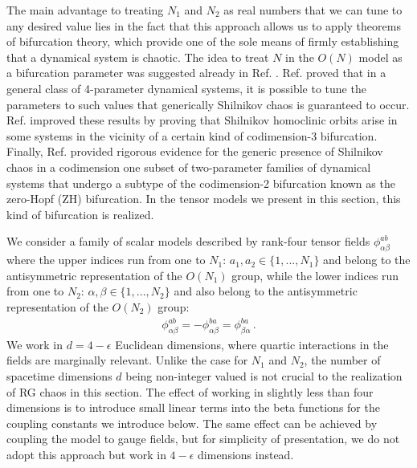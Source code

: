 The main advantage to treating $N_1$ and $N_2$ as real numbers that we can tune to any desired value lies in the fact that this approach allows us to apply theorems of bifurcation theory, which provide one of the sole means of firmly establishing that a dynamical system is chaotic. The idea to treat $N$ in the $O(N)$ model as a bifurcation parameter was suggested already in Ref. \cite{Damgaard:1991zb}. Ref. \cite{ibanez1995sil} proved that in a general class of 4-parameter dynamical systems, it is possible to tune the parameters to such values that generically Shilnikov chaos is guaranteed to occur. Ref. \cite{ibanez2005shil} improved these results by proving that Shilnikov homoclinic orbits arise in some systems in the vicinity of a certain kind of codimension-3 bifurcation. Finally, Ref. \cite{baldoma2020hopf} provided rigorous evidence for the generic presence of Shilnikov chaos in a codimension one subset of two-parameter families of dynamical systems that undergo a subtype of the codimension-2 bifurcation known as the zero-Hopf (ZH) bifurcation. In the tensor models we present in this section, this kind of bifurcation is realized.

We consider a family of scalar models described by rank-four tensor fields $\phi^{ab}_{\alpha\beta}$ where the upper indices run from one to $N_1$: $a_1,a_2 \in\{1,...,N_1\}$ and belong to the antisymmetric representation of the $O(N_1)$ group, while the lower indices run from one to $N_2$: $\alpha,\beta\in\{1,...,N_2\}$ and also belong to the antisymmetric representation of the $O(N_2)$ group:
\begin{align}
\phi^{ab}_{\alpha\beta} = -\phi^{ba}_{\alpha\beta} = \phi^{ba}_{\beta\alpha}\,.
\end{align}
We work in $d=4-\epsilon$ Euclidean dimensions, where quartic interactions in the fields are marginally relevant. Unlike the case for $N_1$ and $N_2$, the number of spacetime dimensions $d$ being non-integer valued is not crucial to the realization of RG chaos in this section. The effect of working in slightly less than four dimensions is to introduce small linear terms into the beta functions for the coupling constants we introduce below. The same effect can be achieved by coupling the model to gauge fields, but for simplicity of presentation, we do not adopt this approach but work in $4-\epsilon$ dimensions instead.

